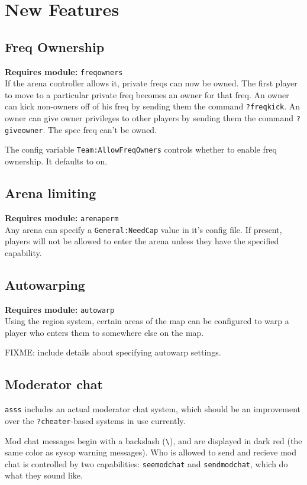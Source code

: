\documentclass{article}
\newcommand{\requiremod}[1]{\noindent\textbf{Requires module:} \texttt{#1}\\}
\newcommand{\asss}{\texttt{asss}}
\begin{document}
\section{New Features}

\subsection{Freq Ownership}

\requiremod{freqowners}
If the arena controller allows it, private freqs can now be owned. The
first player to move to a particular private freq becomes an owner for
that freq. An owner can kick non-owners off of his freq by sending them
the command \verb/?freqkick/. An owner can give owner privileges to
other players by sending them the command \verb/?giveowner/. The spec
freq can't be owned.

The config variable \texttt{Team:AllowFreqOwners} controls whether to
enable freq ownership. It defaults to on.

\subsection{Arena limiting}

\requiremod{arenaperm}
Any arena can specify a \texttt{General:NeedCap} value in it's config
file. If present, players will not be allowed to enter the arena unless
they have the specified capability.


\subsection{Autowarping}

\requiremod{autowarp}
Using the region system, certain areas of the map can be configured to
warp a player who enters them to somewhere else on the map.

FIXME: include details about specifying autowarp settings.


\subsection{Moderator chat}

\asss{} includes an actual moderator chat system, which should be an
improvement over the \verb/?cheater/-based systems in use currently.

Mod chat messages begin with a backslash (\verb/\/), and are displayed
in dark red (the same color as sysop warning messages). Who is allowed
to send and recieve mod chat is controlled by two capabilities:
\texttt{seemodchat} and \texttt{sendmodchat}, which do what they sound
like.
\end{document}
